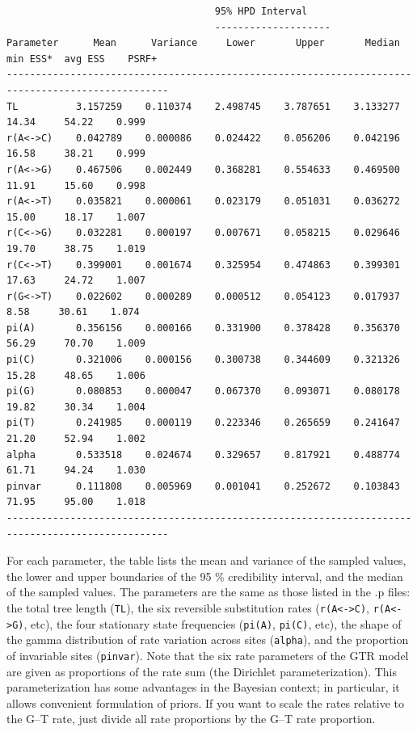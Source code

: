 \documentclass[12pt]{book}
\newcommand{\ttt}[1]{\texttt{#1}}
\begin{document}
\begin{singlespacing}
\scriptsize
\begin{verbatim}
                                    95% HPD Interval
                                    --------------------
Parameter      Mean      Variance     Lower       Upper       Median    min ESS*  avg ESS    PSRF+ 
--------------------------------------------------------------------------------------------------
TL          3.157259    0.110374    2.498745    3.787651    3.133277     14.34     54.22    0.999
r(A<->C)    0.042789    0.000086    0.024422    0.056206    0.042196     16.58     38.21    0.999
r(A<->G)    0.467506    0.002449    0.368281    0.554633    0.469500     11.91     15.60    0.998
r(A<->T)    0.035821    0.000061    0.023179    0.051031    0.036272     15.00     18.17    1.007
r(C<->G)    0.032281    0.000197    0.007671    0.058215    0.029646     19.70     38.75    1.019
r(C<->T)    0.399001    0.001674    0.325954    0.474863    0.399301     17.63     24.72    1.007
r(G<->T)    0.022602    0.000289    0.000512    0.054123    0.017937      8.58     30.61    1.074
pi(A)       0.356156    0.000166    0.331900    0.378428    0.356370     56.29     70.70    1.009
pi(C)       0.321006    0.000156    0.300738    0.344609    0.321326     15.28     48.65    1.006
pi(G)       0.080853    0.000047    0.067370    0.093071    0.080178     19.82     30.34    1.004
pi(T)       0.241985    0.000119    0.223346    0.265659    0.241647     21.20     52.94    1.002
alpha       0.533518    0.024674    0.329657    0.817921    0.488774     61.71     94.24    1.030
pinvar      0.111808    0.005969    0.001041    0.252672    0.103843     71.95     95.00    1.018
--------------------------------------------------------------------------------------------------
\end{verbatim}
\normalsize
\end{singlespacing}

For each parameter, the table lists the mean and variance of the sampled values, the lower and
upper boundaries of the 95 \% credibility interval, and the median of the sampled values. The
parameters are the same as those listed in the .p files: the total tree length (\ttt{TL}), the six
reversible substitution rates (\ttt{r(A<->C)}, \ttt{r(A<->G)}, etc), the four stationary state
frequencies (\ttt{pi(A)}, \ttt{pi(C)}, etc), the shape of the gamma distribution of rate variation
across sites (\ttt{alpha}), and the proportion of invariable sites (\ttt{pinvar}). Note that the
six rate parameters of the GTR model are given as proportions of the rate sum (the Dirichlet
parameterization). This parameterization has some advantages in the Bayesian context; in
particular, it allows convenient formulation of priors. If you want to scale the rates relative to
the G--T rate, just divide all rate proportions by the G--T rate proportion.
\end{document}
